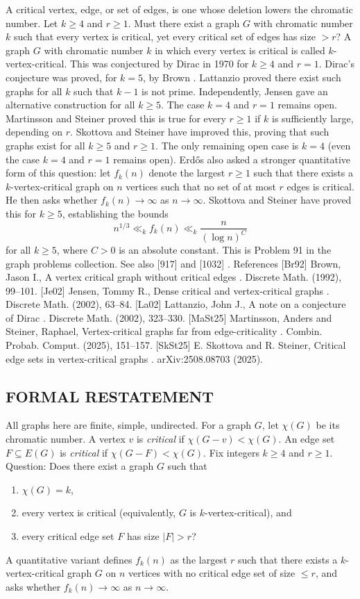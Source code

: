 A critical vertex, edge, or set of edges, is one whose deletion lowers the chromatic number. Let $k\geq 4$ and $r\geq 1$. Must there exist a graph $G$ with chromatic number $k$ such that every vertex is critical, yet every critical set of edges has size $>r$? A graph $G$ with chromatic number $k$ in which every vertex is critical is called $k$-vertex-critical. This was conjectured by Dirac in 1970 for $k\geq 4$ and $r=1$. Dirac's conjecture was proved, for $k=5$, by Brown \cite{Br92}. Lattanzio \cite{La02} proved there exist such graphs for all $k$ such that $k-1$ is not prime. Independently, Jensen \cite{Je02} gave an alternative construction for all $k\geq 5$. The case $k=4$ and $r=1$ remains open. Martinsson and Steiner \cite{MaSt25} proved this is true for every $r\geq 1$ if $k$ is sufficiently large, depending on $r$. Skottova and Steiner \cite{SkSt25} have improved this, proving that such graphs exist for all $k\geq 5$ and $r\geq 1$. The only remaining open case is $k=4$ (even the case $k=4$ and $r=1$ remains open). Erd\H{o}s also asked a stronger quantitative form of this question: let $f_k(n)$ denote the largest $r\geq 1$ such that there exists a $k$-vertex-critical graph on $n$ vertices such that no set of at most $r$ edges is critical. He then asks whether $f_k(n)\to \infty$ as $n\to \infty$. Skottova and Steiner \cite{SkSt25} have proved this for $k\geq 5$, establishing the bounds\[n^{1/3}\ll_k f_k(n) \ll_k \frac{n}{(\log n)^C}\]for all $k\geq 5$, where $C>0$ is an absolute constant. This is Problem 91 in the graph problems collection. See also [917] and [1032] . References [Br92] Brown, Jason I., A vertex critical graph without critical edges . Discrete Math. (1992), 99--101. [Je02] Jensen, Tommy R., Dense critical and vertex-critical graphs . Discrete Math. (2002), 63--84. [La02] Lattanzio, John J., A note on a conjecture of {D}irac . Discrete Math. (2002), 323--330. [MaSt25] Martinsson, Anders and Steiner, Raphael, Vertex-critical graphs far from edge-criticality . Combin. Probab. Comput. (2025), 151--157. [SkSt25] E. Skottova and R. Steiner, Critical edge sets in vertex-critical graphs . arXiv:2508.08703 (2025).

\subsection*{FORMAL RESTATEMENT}
All graphs here are finite, simple, undirected.
For a graph $G$, let $\chi(G)$ be its chromatic number.
A vertex $v$ is \emph{critical} if $\chi(G-v)<\chi(G)$.
An edge set $F\subseteq E(G)$ is \emph{critical} if $\chi(G-F)<\chi(G)$.
Fix integers $k\ge 4$ and $r\ge 1$.
Question: Does there exist a graph $G$ such that
\begin{enumerate}
\item $\chi(G)=k$,
\item every vertex is critical (equivalently, $G$ is $k$-vertex-critical), and
\item every critical edge set $F$ has size $|F|>r$?
\end{enumerate}
A quantitative variant defines $f_k(n)$ as the largest $r$ such that there exists a $k$-vertex-critical graph $G$ on $n$ vertices with no critical edge set of size $\le r$, and asks whether $f_k(n)\to\infty$ as $n\to\infty$.

